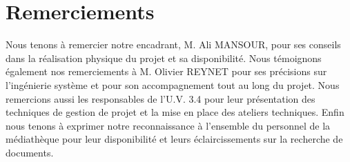 \chapter{Remerciements}

Nous tenons à remercier notre encadrant, M. Ali MANSOUR, pour ses conseils dans la réalisation physique du projet et sa disponibilité.
\bigbreak
Nous témoignons également nos remerciements à M. Olivier REYNET pour ses précisions sur l’ingénierie système et pour son accompagnement tout au long du projet.
\bigbreak
Nous remercions aussi les responsables de l’U.V. 3.4 pour leur présentation des techniques de gestion de projet et la mise en place des ateliers techniques.
\bigbreak
Enfin nous tenons à exprimer notre reconnaissance à l’ensemble du personnel de la médiathèque pour leur disponibilité et leurs éclaircissements sur la recherche de documents.